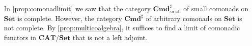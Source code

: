 \documentclass[11pt, oneside, article]{memoir}
\theoremstyle{plain}
\theoremstyle{definition}
\theoremstyle{remark}
\newenvironment{counterexample}
{\renewcommand\qedsymbol{$\lrcorner$}%
  \pushQED{\qed}\mycounterexample}
{\popQED\endmycounterexample}
\newcommand{\ot}{\leftarrow}
\newcommand{\namedcat}[1]{\mathbf{#1}}
\newcommand{\Set}{\namedcat{Set}}
\newcommand{\CAT}{\namedcat{CAT}}
\newcommand{\Part}{\namedcat{Part}}
\newcommand{\Cmd}{\mathbb{C}\namedcat{md}}
\newcommand{\CmdSet}{\Cmd}
\newcommand{\Com}{\namedcat{Cmd}^\sharp}
\newcommand{\ComSet}{\Com}
\newcommand{\arro}{\mathbf{2}}
\newcommand{\com}[2]{{#1}^{#2}}
\newcommand{\fun}[2]{{#2}^{#1}}
\newcommand{\AccCom}{\Com_{\mathrm{small}}}
\newcommand{\AccComSet}{\AccCom}
\begin{document}


In \cref{prop:comonadlimit} we saw that the category $\AccComSet$ of
small comonads on $\Set$ is complete. However, the category $\ComSet$
of arbitrary comonads on $\Set$ is not complete. By
\cref{prop:multicoalgebra}, it suffices to find a limit of comonadic
functors in $\CAT/\Set$ that is not a left adjoint.

\end{document}
